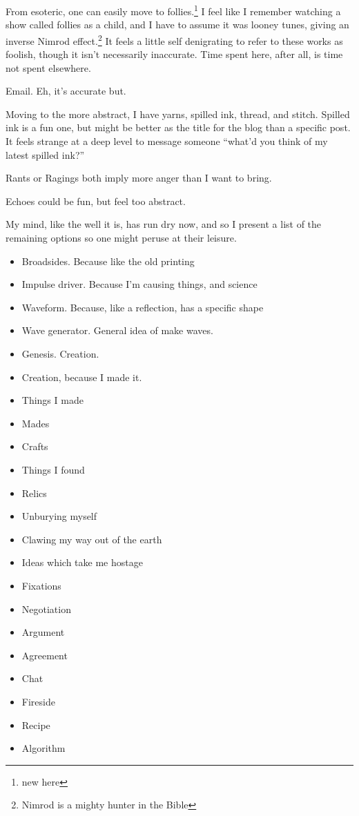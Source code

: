 \documentclass[12pt]{article}
\newcommand{\say}[1]{``#1''}
\renewcommand{\,}{\textsuperscript{,}}
\begin{document}
From esoteric, one can easily move to follies.\footnote{new here}  
I feel like I remember watching a show called follies as a child, and I have to assume it was looney tunes, giving an inverse Nimrod effect.\footnote{Nimrod is a mighty hunter in the Bible}  
It feels a little self denigrating to refer to these works as foolish, though it isn't necessarily inaccurate.  
Time spent here, after all, is time not spent elsewhere.

Email.  
Eh, it's accurate but.

Moving to the more abstract, I have yarns, spilled ink, thread, and stitch.  
Spilled ink is a fun one, but might be better as the title for the blog than a specific post.  
It feels strange at a deep level to message someone \say{what'd you think of my latest spilled ink?}

Rants or Ragings both imply more anger than I want to bring.

Echoes could be fun, but feel too abstract.

My mind, like the well it is, has run dry now, and so I present a list of the remaining options so one might peruse at their leisure.

\begin{itemize}  
\item Broadsides. Because like the old printing  
\item Impulse driver. Because I'm causing things, and science  
\item Waveform. Because, like a reflection, has a specific shape  
\item Wave generator. General idea of make waves.  
\item Genesis. Creation.  
\item Creation, because I made it.  
\item Things I made  
\item Mades  
\item Crafts  
\item Things I found  
\item Relics  
\item Unburying myself  
\item Clawing my way out of the earth  
\item Ideas which take me hostage   
\item Fixations  
\item Negotiation  
\item Argument  
\item Agreement  
\item Chat  
\item Fireside  
\item Recipe  
\item Algorithm  
\end{itemize}
\end{document}
